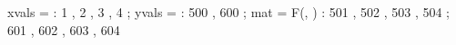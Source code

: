 \begin{functable}
    xvals = \alpha : 1  , 2  , 3  , 4 ;
    yvals = \beta  : 500 , 600 ;
    mat = {F(\alpha, \beta )} : 501 , 502 , 503 , 504 ;
                                601 , 602 , 603 , 604
\end{functable}
